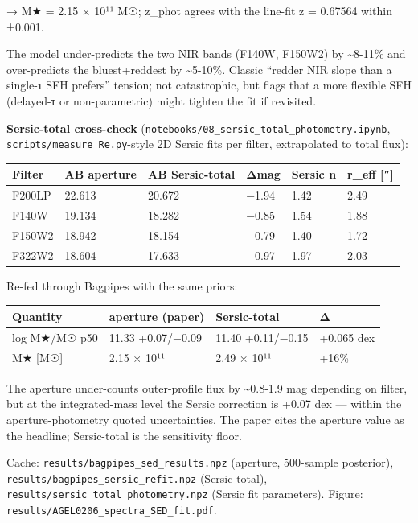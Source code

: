 \documentclass[
  10pt,
]{article}
\begin{document}
→ M★ = 2.15 × 10¹¹ M☉; z\_phot agrees with the line-fit z = 0.67564 within ±0.001.

The model under-predicts the two NIR bands (F140W, F150W2) by \textasciitilde8-11\% and over-predicts the bluest+reddest by \textasciitilde5-10\%. Classic ``redder NIR slope than a single-τ SFH
prefers'' tension; not catastrophic, but flags that a more flexible SFH (delayed-τ or non-parametric) might tighten the fit if revisited.

\textbf{Sersic-total cross-check} (\texttt{notebooks/08\_sersic\_total\_photometry.ipynb}, \texttt{scripts/measure\_Re.py}-style 2D Sersic fits per filter, extrapolated to total flux):

\begingroup\small\setlength{\tabcolsep}{4pt}\begin{longtable}[]{@{}llllll@{}}
\toprule
Filter & AB aperture & AB Sersic-total & Δmag & Sersic n & r\_eff {[}″{]} \\
\midrule
\endhead
F200LP & 22.613 & 20.672 & −1.94 & 1.42 & 2.49 \\
F140W & 19.134 & 18.282 & −0.85 & 1.54 & 1.88 \\
F150W2 & 18.942 & 18.154 & −0.79 & 1.40 & 1.72 \\
F322W2 & 18.604 & 17.633 & −0.97 & 1.97 & 2.03 \\
\bottomrule
\end{longtable}\endgroup

Re-fed through Bagpipes with the same priors:

\begingroup\small\setlength{\tabcolsep}{4pt}\begin{longtable}[]{@{}llll@{}}
\toprule
Quantity & aperture (paper) & Sersic-total & Δ \\
\midrule
\endhead
log M★/M☉ p50 & 11.33 +0.07/−0.09 & 11.40 +0.11/−0.15 & +0.065 dex \\
M★ {[}M☉{]} & 2.15 × 10¹¹ & 2.49 × 10¹¹ & +16\% \\
\bottomrule
\end{longtable}\endgroup

The aperture under-counts outer-profile flux by \textasciitilde0.8-1.9 mag depending on filter, but at the integrated-mass level the Sersic correction is +0.07 dex --- within the aperture-photometry
quoted uncertainties. The paper cites the aperture value as the headline; Sersic-total is the sensitivity floor.

Cache: \texttt{results/bagpipes\_sed\_results.npz} (aperture, 500-sample posterior), \texttt{results/bagpipes\_sersic\_refit.npz} (Sersic-total), \texttt{results/sersic\_total\_photometry.npz} (Sersic
fit parameters). Figure: \texttt{results/AGEL0206\_spectra\_SED\_fit.pdf}.
\end{document}
